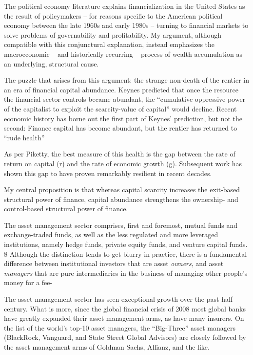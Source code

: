 \documentclass[
]{book}
\begin{document}
The political economy literature explains
financialization in the United States as the result of policymakers -- for reasons specific
to the American political economy between the late 1960s and early 1980s -- turning to
financial markets to solve problems of governability and profitability. My argument,
although compatible with this conjunctural explanation, instead emphasizes the
macroeconomic -- and historically recurring -- process of wealth accumulation as an
underlying, structural cause.

The puzzle that arises from this
argument: the strange non-death of the rentier in an era of financial capital abundance.
Keynes predicted that once the resource the financial sector controls became abundant,
the ``cumulative oppressive power of the capitalist to exploit the scarcity-value of capital''
would decline. Recent economic history has borne out the first part of Keynes' prediction,
but not the second: Finance capital has become abundant, but the rentier has returned
to ``rude health''

As per Piketty, the best measure of this
health is the gap between the rate of return on capital (r) and the rate of economic
growth (g). Subsequent work has shown this gap to have proven
remarkably resilient in recent decades.

My central proposition is that whereas capital scarcity increases the exit-based structural
power of finance, capital abundance strengthens the ownership- and control-based
structural power of finance.

The asset management sector comprises, first and
foremost, mutual funds and exchange-traded funds, as well as the less regulated and
more leveraged institutions, namely hedge funds, private equity funds, and venture
capital funds. 8 Although the distinction tends to get blurry in practice, there is a
fundamental difference between institutional investors that are asset \emph{owners}, and asset
\emph{managers} that are pure intermediaries in the business of managing other people's money
for a fee-

The asset management sector has seen exceptional growth over the
past half century. What is more, since the global financial crisis of 2008 most global
banks have greatly expanded their asset management arms, as have many insurers. On
the list of the world's top-10 asset managers, the ``Big-Three'' asset managers
(BlackRock, Vanguard, and State Street Global Advisors) are closely followed by the
asset management arms of Goldman Sachs, Allianz, and the like.
\end{document}
